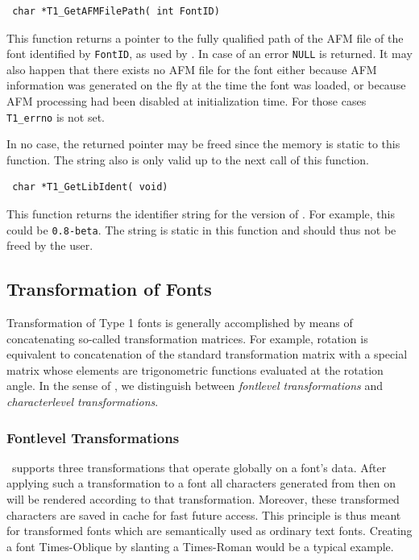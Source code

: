 \precorr
\begin{verbatim}
 char *T1_GetAFMFilePath( int FontID)
\end{verbatim}\postcorr
This function returns a pointer to the fully qualified path of the AFM file of
the font identified by \verb+FontID+, as used by \tonelib. In case of an error
\verb+NULL+ is returned. It may also happen that there exists no AFM file for
the font either because AFM information was generated on the fly at the time
the font was loaded, or because AFM processing had been disabled at
initialization time. For those cases \verb+T1_errno+ is not set.  

In no case, the returned pointer may be freed since the memory is static to
this function.  The string also is only valid up to the next call of this
function.

\precorr
\begin{verbatim}
 char *T1_GetLibIdent( void)
\end{verbatim}\postcorr
This function returns the identifier string for the version of \tonelib. For
example, this could be \verb+0.8-beta+. The string is static in this function
and should thus not be freed by the user.


\subsection{Transformation of Fonts}
\label{transformations}%
Transformation of
Type 1 fonts is generally accomplished by means of concatenating 
so-called transformation matrices. For example, rotation is 
equivalent to concatenation of
the standard transformation matrix with a special matrix whose elements are
trigonometric functions evaluated at the rotation angle. In the sense of
\tonelib, we distinguish between {\em fontlevel transformations} and {\em
  characterlevel transformations}.

\subsubsection{Fontlevel Transformations}
\tonelib\ supports three transformations that operate globally on a font's data.
After applying such a transformation to a font all characters generated from
then on will be rendered according to that transformation. Moreover, these
transformed characters are saved in cache for fast future access. This
principle is thus meant for transformed fonts which are semantically used as
ordinary text fonts. Creating a font Times-Oblique by slanting a Times-Roman
would be a typical example.

